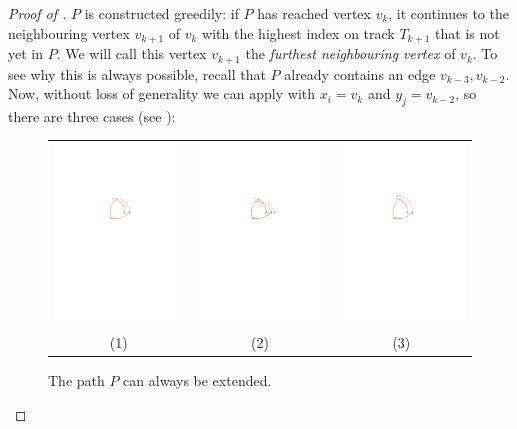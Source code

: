 \documentclass{patmorin}
\begin{document}
\begin{proof}[Proof of ]
  $P$ is constructed greedily: if $P$ has reached vertex $v_k$, it continues to the neighbouring vertex
  $v_{k+1}$ of $v_{k}$ with the highest index on track $T_{k+1}$ that is not yet in $P$.
  We will call this vertex $v_{k+1}$ the \emph{furthest neighbouring vertex} of $v_k$.  To see why this is always possible,
  recall that $P$ already contains an edge $v_{k-3},v_{k-2}$. Now, without loss of generality we can
  apply  with $x_i=v_k$ and $y_j=v_{k-2}$, so there
  are three cases (see ):

\begin{figure}
   \begin{center}
     \begin{tabular}{ccc}
       \includegraphics[width=0.3\columnwidth]{figs/sloppy-1} &
       \includegraphics[width=0.3\columnwidth]{figs/sloppy-2} &
       \includegraphics[width=0.3\columnwidth]{figs/sloppy-3} \\
       (1) & (2) & (3)
     \end{tabular}
   \end{center}
   \caption{The path $P$ can always be extended.}
\end{figure}



\end{proof}
\end{document}
